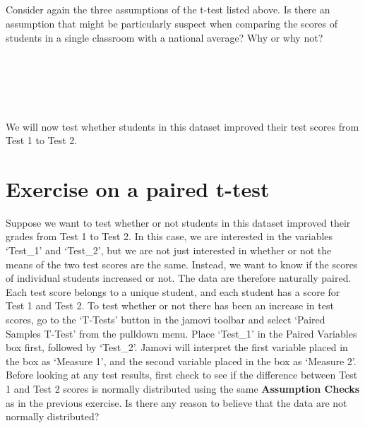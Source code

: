 \documentclass[
  openany]{scrbook}
\begin{document}
\begin{verbatim}





\end{verbatim}

Consider again the three assumptions of the t-test listed above.
Is there an assumption that might be particularly suspect when comparing the scores of students in a single classroom with a national average?
Why or why not?

\begin{verbatim}





\end{verbatim}

We will now test whether students in this dataset improved their test scores from Test 1 to Test 2.

\hypertarget{exercise-on-a-paired-t-test}{%
\section{Exercise on a paired t-test}\label{exercise-on-a-paired-t-test}}

Suppose we want to test whether or not students in this dataset improved their grades from Test 1 to Test 2.
In this case, we are interested in the variables `Test\_1' and `Test\_2', but we are not just interested in whether or not the means of the two test scores are the same.
Instead, we want to know if the scores of individual students increased or not.
The data are therefore naturally paired.
Each test score belongs to a unique student, and each student has a score for Test 1 and Test 2.
To test whether or not there has been an increase in test scores, go to the `T-Tests' button in the jamovi toolbar and select `Paired Samples T-Test' from the pulldown menu.
Place `Test\_1' in the Paired Variables box first, followed by `Test\_2'.
Jamovi will interpret the first variable placed in the box as `Measure 1', and the second variable placed in the box as `Measure 2'.
Before looking at any test results, first check to see if the difference between Test 1 and Test 2 scores is normally distributed using the same \textbf{Assumption Checks} as in the previous exercise.
Is there any reason to believe that the data are not normally distributed?

\begin{verbatim}
\end{verbatim}
\end{document}
